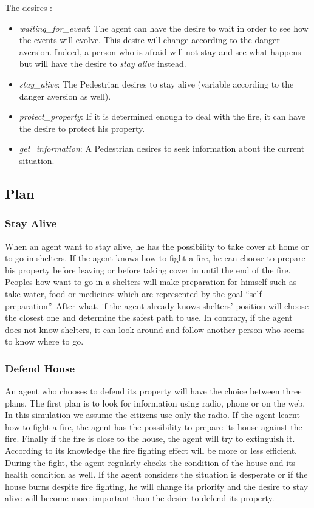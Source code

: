 \documentclass[12pt, a4paper]{memoir} %
\begin{document}
			The desires :
			\begin{itemize}
				\item \textit{waiting\_for\_event}: The agent can have the desire to wait in order to see how the events will evolve.
				This desire will change according to the danger aversion. Indeed, a person who is afraid will not stay
				and see what happens but will have the desire to \textit{stay alive} instead.
				\item \textit{stay\_alive}: The Pedestrian desires to stay alive (variable according to the danger aversion as well).
				\item \textit{protect\_property}: If it is determined enough to deal with the fire, it can have the desire to protect his property.
				\item \textit{get\_information}: A Pedestrian desires to seek information about the current situation.
			\end{itemize}

		\subsection{Plan}

			\subsubsection{Stay Alive}
				When an agent want to stay alive, he has the possibility to take cover at home or to go in shelters.
				If the agent knows how to fight a fire, he can choose to prepare his property before leaving or before taking cover
				in until the end of the fire. Peoples how want to go in a shelters will make preparation for himself such as take water,
				food or medicines which are represented by the goal \textquotedblleft self preparation\textquotedblright.
				After what, if the agent already knows shelters' position will choose the closest one and determine the safest path
				to use. In contrary, if the agent does not know shelters, it can look around and follow another person who seems to
				know where to go.

			\subsubsection{Defend House}
				An agent who chooses to defend its property will have the choice between three plans.
				The first plan is to look for information using radio, phone or on the web.
				In this simulation we assume the citizens use only the radio.
				If the agent learnt how to fight a fire, the agent has the possibility to prepare its house against the fire.
				Finally if the fire is close to the house, the agent will try to extinguish it.
				According to its knowledge the fire fighting effect will be more or less efficient.
				During the fight, the agent regularly checks the condition of the house and its health condition as well.
				If the agent considers the situation is desperate or if the house burns despite fire fighting, he will
				change its priority and the desire to stay alive will become more important than the desire to defend its property.
\end{document}
